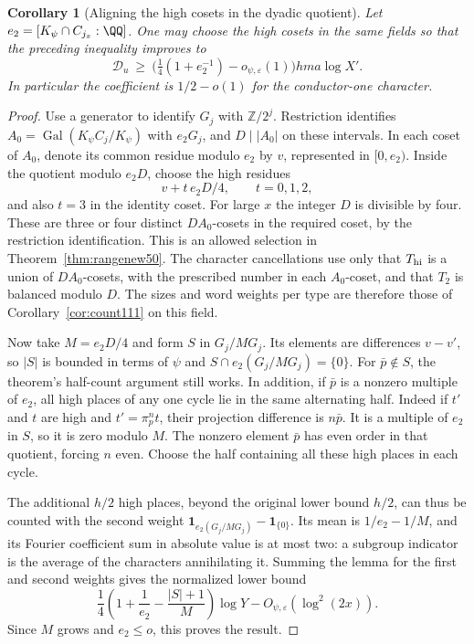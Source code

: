 \documentclass[a4paper,11pt]{article}
\newtheorem{corollary}[proposition]{Corollary}
\theoremstyle{definition}
\theoremstyle{remark}
\newcommand{\ZZ}{\mathbb Z}\newcommand{\ord}{\operatorname{ord}}
\numberwithin{equation}{section}
\begin{document}
\begin{corollary}[Aligning the high cosets in the dyadic quotient]\leavevmode
\label{cor:dyadicchoice462}
Let \(e_2=[K_\psi\cap C_{j_x}:\QQ]\). One may choose the high
cosets in the same fields so that the preceding inequality
improves to
\[
          \mathcal D_u\ \ge\
     \bigl(\tfrac14(1+e_2^{-1})-o_{\psi,\varepsilon}(1)\bigr)
                                  hma\log X'.
\]
In particular the coefficient is \(1/2-o(1)\) for the
conductor-one character.
\end{corollary}
\begin{proof}
Use a generator to identify \(G_j\) with \(\ZZ/2^j\).
Restriction identifies \(A_0=\operatorname{Gal}(K_\psi C_j/K_\psi)\)
with \(e_2 G_j\), and \(D\mid |A_0|\) on these intervals.
In each coset of \(A_0\), denote its common residue modulo
\(e_2\) by \(v\), represented in \([0,e_2)\). Inside the
quotient modulo \(e_2D\), choose the high residues
\[
          v+t\,e_2 D/4,\qquad t=0,1,2,
\]
and also \(t=3\) in the identity coset. For large \(x\)
the integer \(D\) is divisible by four. These are three or
four distinct \(DA_0\)-cosets in the required coset, by the
restriction identification. This is an allowed selection in
Theorem~\ref{thm:rangenew50}. The character cancellations use
only that \(T_{\rm hi}\) is a union of \(DA_0\)-cosets, with
the prescribed number in each \(A_0\)-coset, and that \(T_2\)
is balanced modulo \(D\). The sizes and word weights per type
are therefore those of Corollary~\ref{cor:count111} on this
field.

Now take \(M=e_2D/4\) and form \(S\) in \(G_j/MG_j\).
Its elements are differences \(v-v'\), so \(|S|\) is bounded
in terms of \(\psi\) and \(S\cap e_2(G_j/MG_j)=\{0\}\).
For \(\bar p\notin S\), the theorem's half-count argument still
works. In addition, if \(\bar p\) is a nonzero multiple of
\(e_2\), all high places of any one cycle lie in the same
alternating half. Indeed if \(t'\) and \(t\) are high and
\(t'=\pi_p^n t\), their projection difference is \(n\bar p\).
It is a multiple of \(e_2\) in \(S\), so it is zero modulo
\(M\). The nonzero element \(\bar p\) has even order in that
quotient, forcing \(n\) even. Choose the half containing all
these high places in each cycle.

The additional \(h/2\) high places, beyond the original lower
bound \(h/2\), can thus be counted with the second weight
\(\mathbf1_{e_2(G_j/MG_j)}-\mathbf1_{\{0\}}\). Its mean is
\(1/e_2-1/M\), and its Fourier coefficient sum in absolute
value is at most two: a subgroup indicator is the average of
the characters annihilating it. Summing the lemma for the
first and second weights gives the normalized lower bound
\[
  \frac14\left(1+\frac1{e_2}-\frac{|S|+1}{M}\right)\log Y
                     -O_{\psi,\varepsilon}(\log^2(2x)).
\]
Since \(M\) grows and \(e_2\le o\), this proves the result.
\end{proof}
\end{document}
